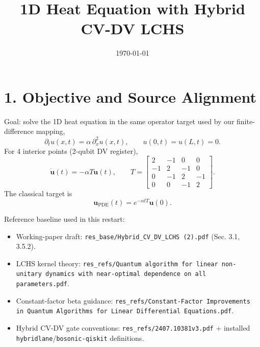 \documentclass[11pt]{article}
\title{1D Heat Equation with Hybrid CV-DV LCHS}
\date{\today}
\begin{document}
\maketitle

\section*{1. Objective and Source Alignment}
Goal: solve the 1D heat equation in the same operator target used by our finite-difference mapping,
\begin{equation}
\partial_t u(x,t)=\alpha\,\partial_x^2 u(x,t),\qquad u(0,t)=u(L,t)=0.
\end{equation}
For 4 interior points (2-qubit DV register),
\begin{equation}
\dot{\bm u}(t)=-\alpha T\bm u(t),\qquad
T=\begin{bmatrix}
2&-1&0&0\\
-1&2&-1&0\\
0&-1&2&-1\\
0&0&-1&2
\end{bmatrix}.
\end{equation}
The classical target is
\begin{equation}
\bm u_{\mathrm{PDE}}(t)=e^{-\alpha tT}\bm u(0).
\end{equation}

Reference baseline used in this restart:
\begin{itemize}
\item Working-paper draft: \texttt{res\_base/Hybrid\_CV\_DV\_LCHS (2).pdf} (Sec. 3.1, 3.5.2).
\item LCHS kernel theory: \texttt{res\_refs/Quantum algorithm for linear non-unitary dynamics with near-optimal dependence on all parameters.pdf}.
\item Constant-factor beta guidance: \texttt{res\_refs/Constant-Factor Improvements in Quantum Algorithms for Linear Differential Equations.pdf}.
\item Hybrid CV-DV gate conventions: \texttt{res\_refs/2407.10381v3.pdf} + installed \texttt{hybridlane}/\texttt{bosonic-qiskit} definitions.
\end{itemize}
\end{document}
